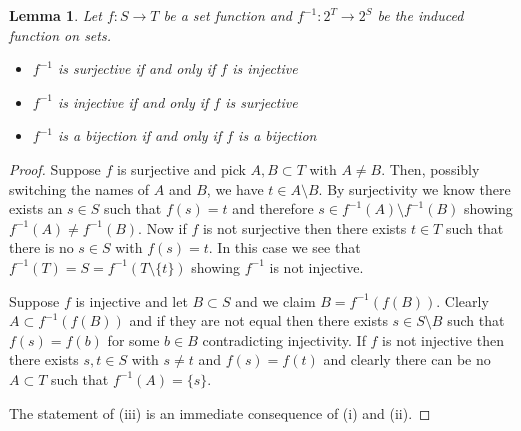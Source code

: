 \documentclass{amsart}
\newtheorem{lem}[thm]{Lemma}
\theoremstyle{remark}
\theoremstyle{definition}
\begin{document}
\begin{lem}\label{BijectivityOfInducedSetMap}Let $f : S \to T$ be a set function and $f^{-1} : 2^T \to
  2^S$ be the induced function on sets.
\begin{itemize}
\item[(i)]$f^{-1}$ is surjective if and only if $f$ is injective
\item[(ii)]$f^{-1}$ is injective if and only if $f$ is surjective
\item[(iii)]$f^{-1}$ is a bijection if and only if $f$ is a bijection
\end{itemize}
\end{lem}
\begin{proof}
Suppose $f$ is surjective and pick $A, B \subset T$ with $A \neq B$.
Then, possibly switching the names of $A$ and $B$, we have $t \in A
\setminus B$.  By surjectivity we know there exists an $s \in S$ such
that $f(s) = t$ and therefore $s \in f^{-1}(A) \setminus f^{-1}(B)$
showing $ f^{-1}(A) \neq f^{-1}(B)$.  Now if $f$ is not surjective
then there exists $t \in T$ such that there is no $s \in S$ with $f(s)
= t$.  In this case we see that $f^{-1}(T) = S = f^{-1}(T \setminus
\lbrace t \rbrace)$ showing $f^{-1}$ is not injective.

Suppose $f$ is injective and let $B \subset S$ and we claim $B =
f^{-1}(f(B))$.  Clearly $A \subset f^{-1}(f(B))$ and if they are not
equal then there exists $s \in S \setminus B$ such that $f(s) = f(b)$
for some $b \in B$ contradicting injectivity.  If $f$ is not injective
then there exists $s,t \in S$ with $s \neq t$ and $f(s) = f(t)$ and
clearly there can be no $A \subset T$ such that $f^{-1}(A) = \lbrace s \rbrace$.

The statement of (iii) is an immediate consequence of (i) and (ii).
\end{proof}
\end{document}

